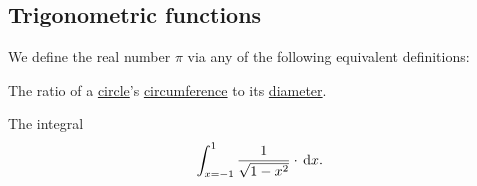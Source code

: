 \subsection{Trigonometric functions}\label{subsec:trigonometric_functions}

\begin{definition}\label{def:pi}
  We define the real number \( \pi \) via any of the following equivalent definitions:
  \begin{thmenum}
     The ratio of a \hyperref[def:circle]{circle}'s \hyperref[def:circumference]{circumference} to its \hyperref[def:metric_space/diameter]{diameter}.

     The integral
    \begin{equation}\label{eq:def:pi/integral}
      \int_{x=-1}^1 \frac 1 { \sqrt{1 - x^2} } \cdot \dl x.
    \end{equation}
  \end{thmenum}
\end{definition}
